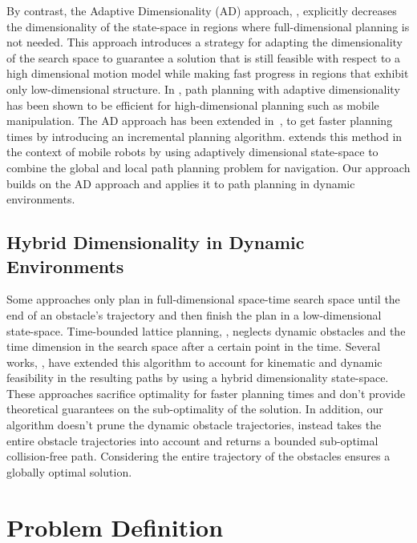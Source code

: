 By contrast, the Adaptive Dimensionality (AD) approach, \cite{gochev2011path}, explicitly decreases the dimensionality of the state-space in regions where full-dimensional planning is not needed. This approach introduces a strategy for adapting the dimensionality of the search space to guarantee a solution that is still feasible with respect to a high dimensional motion model while making fast progress in regions that exhibit only low-dimensional structure. In \cite{gochev2012planning}, path planning with adaptive dimensionality has been shown to be efficient for high-dimensional planning such as mobile manipulation. The AD approach has been extended in~\cite{gochev2013incremental}, to get faster planning times by introducing an incremental planning algorithm. \cite{zhang2012combining} extends this method in the context of mobile robots by using adaptively dimensional state-space to combine the global and local path planning problem for navigation. Our approach builds on the AD approach and applies it to path planning in dynamic environments.

\subsection{Hybrid Dimensionality in Dynamic Environments}
Some approaches only plan in full-dimensional space-time search space until the end of an obstacle's trajectory and then finish the plan in a low-dimensional state-space. Time-bounded lattice planning, \cite{kushleyev2009time}, neglects dynamic obstacles and the time dimension in the search space after a certain point in the time. Several works, \cite{petereit2013mobile,petereit2014combined}, have extended this algorithm to account for kinematic and dynamic feasibility in the resulting paths by using a hybrid dimensionality state-space. These approaches sacrifice optimality for faster planning times and don't provide theoretical guarantees on the sub-optimality of the solution. In addition, our algorithm doesn't prune the dynamic obstacle trajectories, instead takes the entire obstacle trajectories into account and returns a bounded sub-optimal collision-free path. Considering the entire trajectory of the obstacles ensures a globally optimal solution.

\section{Problem Definition}\label{sec:ppad-problem}

